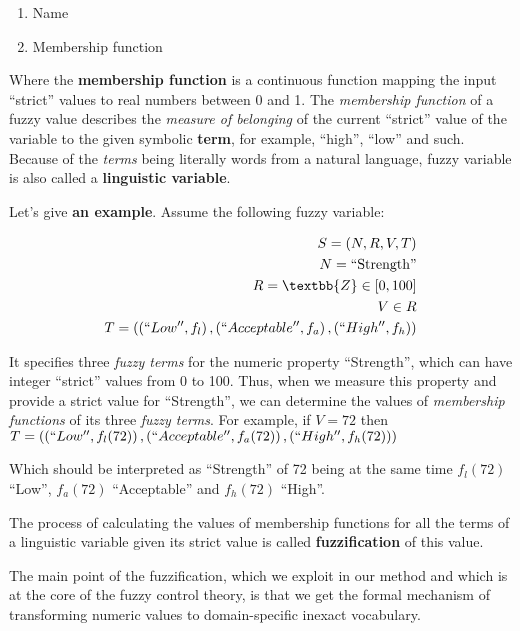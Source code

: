 \documentclass[11pt, a4paper]{article}
\begin{document}
  \begin{enumerate}
    \item Name
    \item Membership function
  \end{enumerate}

  Where the \textbf{membership function} is a continuous function mapping the input ``strict'' values to real numbers between 0 and 1.
  The \textit{membership function} of a fuzzy value describes the \textit{measure of belonging} of the current ``strict'' value of the variable to the given symbolic \textbf{term},
  for example, ``high'', ``low'' and such.
  Because of the \textit{terms} being literally words from a natural language, fuzzy variable is also called a \textbf{linguistic variable}.

  Let's give \textbf{an example}.
  Assume the following fuzzy variable:

  \begin{eqnarray}
    S = \left(N, R, V, T\right)\\
    N = \text{``Strength''}\\
    R = \textbb{Z} \in [0, 100]\\
    V \in R\\
    T = \left(\left(``Low'', f_l\right), \left(``Acceptable'', f_a\right), \left(``High'', f_h\right)\right)
  \end{eqnarray}

  It specifies three \textit{fuzzy terms} for the numeric property ``Strength'', which can have integer ``strict'' values from 0 to 100.
  Thus, when we measure this property and provide a strict value for ``Strength'', we can determine the values of \textit{membership functions} of its three \textit{fuzzy terms}.
  For example, if
    $V = 72$
  then
    $T = \left(\left(``Low'', f_l(72) \right), \left(``Acceptable'', f_a(72) \right), \left(``High'', f_h(72)\right)\right)$

  Which should be interpreted as ``Strength'' of 72 being at the same time $f_l(72)$ ``Low'', $f_a(72)$ ``Acceptable'' and $f_h(72)$ ``High''.

  The process of calculating the values of membership functions for all the terms of a linguistic variable given its strict value is called \textbf{fuzzification} of this value.

  The main point of the fuzzification, which we exploit in our method and which is at the core of the fuzzy control theory, is that we get the formal mechanism of transforming numeric values to domain-specific inexact vocabulary.
\end{document}
